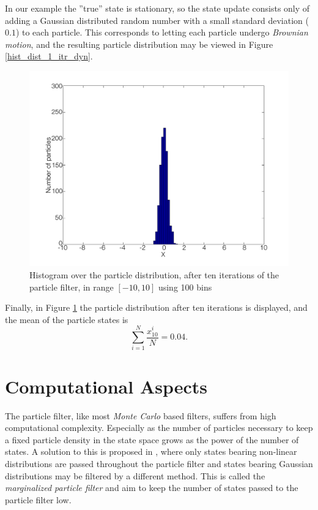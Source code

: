 \documentclass{LTHthesis}
\begin{document}
In our example the ''true'' state is stationary, so the state update consists only of adding a Gaussian distributed random number with a small standard deviation ($0.1$) to each particle. This corresponds to letting each particle undergo \emph{Brownian motion}, and the resulting particle distribution may be viewed in Figure \ref{hist_dist_1_itr_dyn}.
%
\begin{figure}[!hbt]

\includegraphics[width=1\textwidth ]{images/PF/hist_dist_10_itr}
\caption{Histogram over the particle distribution, after ten iterations of the particle filter, in range $[-10,10]$ using 100 bins}\label{hist_dist_10_itr}
\end{figure}

Finally, in Figure \ref{hist_dist_10_itr} the particle distribution after ten iterations is displayed, and the mean of the particle states is
\begin{equation}
\sum^{N}_{i=1}{\frac{x^i_{10}}{N}} = 0.04.
\end{equation} 
%
\section{Computational Aspects}
\label{sec:com_asp}
%
The particle filter, like most \emph{Monte Carlo} based filters, suffers from high computational complexity. Especially as the number of particles necessary to keep a fixed particle density in the state space grows as the power of the number of states. A solution to this is proposed in \cite{gson12}, where only states bearing non-linear distributions are passed throughout the particle filter and states bearing Gaussian distributions may be filtered by a different method. This is called the \emph{marginalized particle filter} and aim to keep the number of states passed to the particle filter low. 
\end{document}
